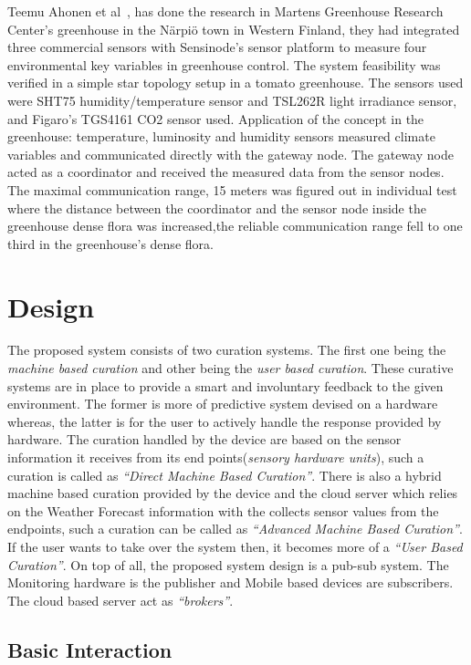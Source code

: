 \documentclass[10pt]{article}
\begin{document}
Teemu Ahonen et al~\cite{ref004}, has done the research in Martens Greenhouse Research Center’s greenhouse in the Närpiö town in Western Finland, they had integrated three commercial sensors with Sensinode’s sensor platform to measure four environmental key variables in greenhouse control.
The system feasibility was verified in a simple star topology setup in a tomato greenhouse.
The sensors used were SHT75 humidity/temperature sensor and TSL262R light irradiance sensor, and Figaro’s TGS4161 CO2 sensor used. 
Application of the concept in the greenhouse: temperature, luminosity and humidity sensors measured climate variables and communicated directly with the gateway node. 
The gateway node acted as a coordinator and received the measured data from the sensor nodes. 
The maximal communication range, 15 meters was figured out in individual test where the distance between the coordinator and the sensor node inside the greenhouse dense flora was increased,the reliable communication range fell to one third in the greenhouse's dense flora. 

\section*{Design}

The proposed system consists of two curation systems. 
The first one being the \emph{machine based curation} and other being the \emph{user based curation}. 
These curative systems are in place to provide a smart and involuntary feedback to the given environment. 
The former is more of predictive system devised on a hardware whereas, the latter is for the user to actively handle the response provided by hardware. 
The curation handled by the device are based on the sensor information it receives from its end points(\emph{sensory hardware units}), such a curation is called as \emph{``Direct Machine Based Curation''}. 
There is also a hybrid machine based curation provided by the device and the cloud server which relies on the Weather Forecast information with the collects sensor values from the endpoints, such a curation can be called as \emph{``Advanced Machine Based Curation''}. 
If the user wants to take over the system then, it becomes more of a \emph{``User Based Curation''}. 
On top of all, the proposed system design is a pub-sub system. 
The Monitoring hardware is the publisher and Mobile based devices are subscribers. 
The cloud based server act as \emph{``brokers''}. 

\subsection*{Basic Interaction}
\end{document}
